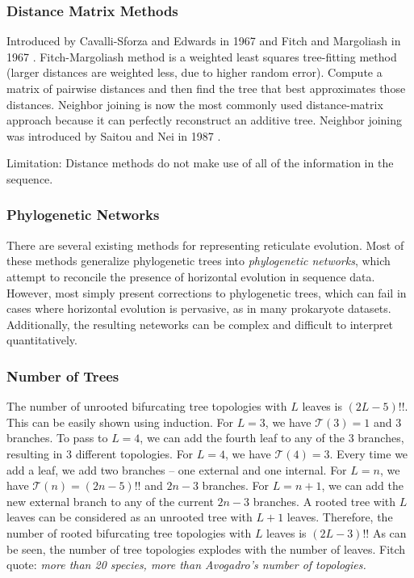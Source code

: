 \subsubsection{Distance Matrix Methods}

Introduced by Cavalli-Sforza and Edwards in 1967 \cite{CavalliSforza:1967th} and Fitch and Margoliash in 1967 \cite{Fitch:1967we}.
Fitch-Margoliash method is a weighted least squares tree-fitting method (larger distances are weighted less, due to higher random error).
Compute a matrix of pairwise distances and then find the tree that best approximates those distances.
Neighbor joining is now the most commonly used distance-matrix approach because it can perfectly reconstruct an additive tree.
Neighbor joining was introduced by Saitou and Nei in 1987 \cite{Saitou:1987wo}.

Limitation: Distance methods do not make use of all of the information in the sequence.

\subsubsection{Phylogenetic Networks}

There are several existing methods for representing reticulate evolution.
Most of these methods generalize phylogenetic trees into \emph{phylogenetic networks}, which attempt to reconcile the presence of horizontal evolution in sequence data.
However, most simply present corrections to phylogenetic trees, which can fail in cases where horizontal evolution is pervasive, as in many prokaryote datasets.
Additionally, the resulting neteworks can be complex and difficult to interpret quantitatively.

\subsubsection{Number of Trees}

The number of unrooted bifurcating tree topologies with $L$ leaves is $(2L-5)!!$.
This can be easily shown using induction.
For $L=3$, we have $\mathcal{T}(3)=1$ and $3$ branches.
To pass to $L=4$, we can add the fourth leaf to any of the $3$ branches, resulting in $3$ different topologies.
For $L=4$, we have $\mathcal{T}(4)=3$.
Every time we add a leaf, we add two branches -- one external and one internal.
For $L=n$, we have $\mathcal{T}(n)=(2n-5)!!$ and $2n-3$ branches.
For $L=n+1$, we can add the new external branch to any of the current $2n-3$ branches.
A rooted tree with $L$ leaves can be considered as an unrooted tree with $L+1$ leaves.
Therefore, the number of rooted bifurcating tree topologies with $L$ leaves is $(2L-3)!!$
As can be seen, the number of tree topologies explodes with the number of leaves.
Fitch quote: \emph{more than 20 species, more than Avogadro's number of topologies.}

